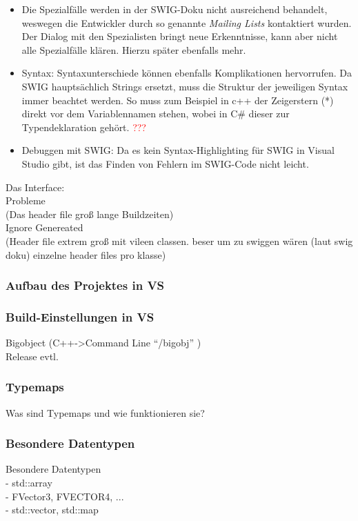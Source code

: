 \begin{itemize}
\begin{itemize}
	\end{itemize}
\item Die Spezialfälle werden in der SWIG-Doku nicht ausreichend behandelt, weswegen die Entwickler durch so genannte \emph{Mailing Lists} kontaktiert wurden. Der Dialog mit den Spezialisten bringt neue Erkenntnisse, kann aber nicht alle Spezialfälle klären. Hierzu später ebenfalls mehr.
\item Syntax: Syntaxunterschiede können ebenfalls Komplikationen hervorrufen. Da SWIG hauptsächlich Strings ersetzt, muss die Struktur der jeweiligen Syntax immer beachtet werden. So muss zum Beispiel in c++ der Zeigerstern (*) direkt vor dem Variablennamen stehen, wobei in C\# dieser zur Typendeklaration gehört. \textcolor{red}{???}
\item Debuggen mit SWIG: Da es kein Syntax-Highlighting für SWIG in Visual Studio gibt, ist das Finden von Fehlern im SWIG-Code nicht leicht.  
\end{itemize}


Das Interface:\\
	
	
		
	Probleme\\
	(Das header file groß lange Buildzeiten)\\
	Ignore Genereated\\
	(Header file extrem groß  mit vileen classen. beser um zu swiggen wären (laut swig doku) einzelne header files pro klasse)

\subsubsection{Aufbau des Projektes in VS}\label{subsubsec:Aufbau}


\subsubsection{Build-Einstellungen in VS}\label{subsubsec:Build}
	Bigobject (C++->Command Line "`/bigobj"' )\\
	Release evtl.


\subsubsection{Typemaps}\label{subsubsec:Typemaps}

Was sind Typemaps und wie funktionieren sie?\\

\subsubsection{Besondere Datentypen}\label{subsubsec:Datentypen}
Besondere Datentypen\\
		- std::array\\
		- FVector3, FVECTOR4, ...\\
		- std::vector, std::map\\
		
